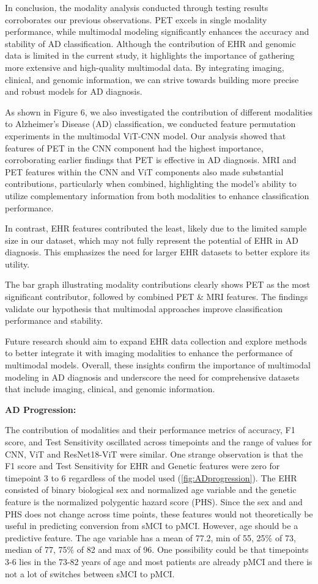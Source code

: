 In conclusion, the modality analysis conducted through testing results corroborates our previous observations. PET excels in single modality performance, while multimodal modeling significantly enhances the accuracy and stability of AD classification. Although the contribution of EHR and genomic data is limited in the current study, it highlights the importance of gathering more extensive and high-quality multimodal data. By integrating imaging, clinical, and genomic information, we can strive towards building more precise and robust models for AD diagnosis. 

As shown in Figure 6, we also investigated the contribution of different modalities to Alzheimer's Disease (AD) classification, we conducted feature permutation experiments in the multimodal ViT-CNN model. Our analysis showed that features of PET in the CNN component had the highest importance, corroborating earlier findings that PET is effective in AD diagnosis. MRI and PET features within the CNN and ViT components also made substantial contributions, particularly when combined, highlighting the model's ability to utilize complementary information from both modalities to enhance classification performance. 

In contrast, EHR features contributed the least, likely due to the limited sample size in our dataset, which may not fully represent the potential of EHR in AD diagnosis. This emphasizes the need for larger EHR datasets to better explore its utility. 

The bar graph illustrating modality contributions clearly shows PET as the most significant contributor, followed by combined PET \& MRI features. The findings validate our hypothesis that multimodal approaches improve classification performance and stability. 

Future research should aim to expand EHR data collection and explore methods to better integrate it with imaging modalities to enhance the performance of multimodal models. Overall, these insights confirm the importance of multimodal modeling in AD diagnosis and underscore the need for comprehensive datasets that include imaging, clinical, and genomic information. 

\textbf{AD Progression: }

The contribution of modalities and their performance metrics of accuracy, F1 score, and Test Sensitivity oscillated across timepoints and the range of values for CNN, ViT and ResNet18-ViT were similar. One strange observation is that the F1 score and Test Sensitivity for EHR and Genetic features were zero for timepoint 3 to 6 regardless of the model used (\autoref{fig:ADprogression}). The EHR consisted of binary biological sex and normalized age variable and the genetic feature is the normalized polygentic hazard score (PHS). Since the sex and and PHS does not change across time points, these features would not theoretically be useful in predicting conversion from sMCI to pMCI. However, age should be a predictive feature. The age variable has a mean of 77.2, min of 55, 25\% of 73, median of 77, 75\% of 82 and max of 96. One possibility could be that timepoints 3-6 lies in the 73-82 years of age and most patients are already pMCI and there is not a lot of switches between sMCI to pMCI. 

\
